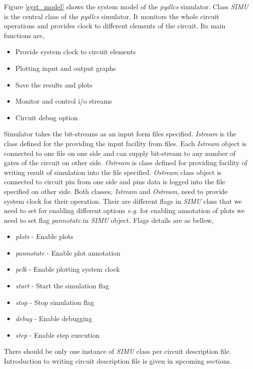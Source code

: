 \documentclass[a4paper,12pt]{article}
\begin{document}
Figure \ref{syst_model} shows the system model of the \emph{pydlcs} simulator. Class \emph{SIMU} is the central class of the \emph{pydlcs} simulator. It monitors the whole circuit operations and provides clock to different elements of the circuit. Its main functions are,
\begin{itemize}
 \item Provide system clock to circuit elements
 \item Plotting input and output graphs
 \item Save the results and plots
 \item Monitor and control i/o streams
 \item Circuit debug option
\end{itemize}



 Simulator takes the bit-streams as an input form files specified. \emph{Istream} is the class defined for the providing the input facility from files. Each \emph{Istream} object is connected to one file on one side and can supply bit-stream to any number of gates of the circuit on other side. \emph{Ostream} is class defined for providing facility of writing result of simulation into the file specified. \emph{Ostream} class object is connected to circuit pin from one side and pins data is logged into the file specified on other side. Both classes, \emph{Istream} and \emph{Ostream}, need to provide system clock for their operation. Their are different flags in \emph{SIMU} class that we need to set for enabling different options \emph{e.g.} for enabling annotation  of plots we need to set flag \emph{pannotate} in \emph{SIMU} object. Flags details are as bellow,
\begin{itemize}
 \item \emph{plots} - Enable plots
 \item \emph{pannotate} - Enable plot annotation
 \item \emph{pclk} - Enable plotting system clock
 \item \emph{start} - Start the simulation flag
 \item \emph{stop} - Stop simulation flag
 \item \emph{debug} - Enable debugging
 \item \emph{step} - Enable step execution
\end{itemize}

 There should be only one instance of \emph{SIMU} class per circuit description file. Introduction to writing circuit description file is given in upcoming sections. 
\end{document}
